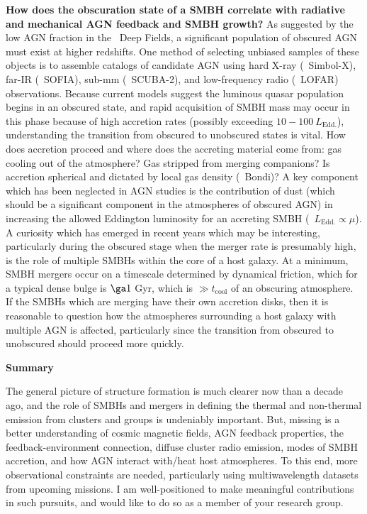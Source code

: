 \documentclass[12pt]{article}
\begin{document}
{\bf{How does the obscuration state of a SMBH correlate with radiative
    and mechanical AGN feedback and SMBH growth?}} As suggested by the
low AGN fraction in the \chandra\ Deep Fields, a significant
population of obscured AGN must exist at higher redshifts. One method
of selecting unbiased samples of these objects is to assemble catalogs
of candidate AGN using hard X-ray (\ie\ Simbol-X), far-IR
(\ie\ SOFIA), sub-mm (\ie\ SCUBA-2), and low-frequency radio
(\ie\ LOFAR) observations. Because current models suggest the luminous
quasar population begins in an obscured state, and rapid acquisition
of SMBH mass may occur in this phase because of high accretion rates
(possibly exceeding $10-100~L_{\mathrm{Edd.}}$), understanding the
transition from obscured to unobscured states is vital. How does
accretion proceed and where does the accreting material come from: gas
cooling out of the atmosphere? Gas stripped from merging companions?
Is accretion spherical and dictated by local gas density (\eg\ Bondi)?
A key component which has been neglected in AGN studies is the
contribution of dust (which should be a significant component in the
atmospheres of obscured AGN) in increasing the allowed Eddington
luminosity for an accreting SMBH (\ie\ $L_{\mathrm{Edd.}} \propto
\mu$). A curiosity which has emerged in recent years which may be
interesting, particularly during the obscured stage when the merger
rate is presumably high, is the role of multiple SMBHs within the core
of a host galaxy. At a minimum, SMBH mergers occur on a timescale
determined by dynamical friction, which for a typical dense bulge is
$\ga 1$ Gyr, which is $\gg t_{\mathrm{cool}}$ of an obscuring
atmosphere. If the SMBHs which are merging have their own accretion
disks, then it is reasonable to question how the atmospheres
surrounding a host galaxy with multiple AGN is affected, particularly
since the transition from obscured to unobscured should proceed more
quickly.

{\bf{Summary}}


The general picture of structure formation is much clearer now than a
decade ago, and the role of SMBHs and mergers in defining the thermal
and non-thermal emission from clusters and groups is undeniably
important. But, missing is a better understanding of cosmic magnetic
fields, AGN feedback properties, the feedback-environment connection,
diffuse cluster radio emission, modes of SMBH accretion, and how AGN
interact with/heat host atmospheres. To this end, more observational
constraints are needed, particularly using multiwavelength datasets
from upcoming missions. I am well-positioned to make meaningful
contributions in such pursuits, and would like to do so as a member of
your research group.

\scriptsize


 
\end{document}
